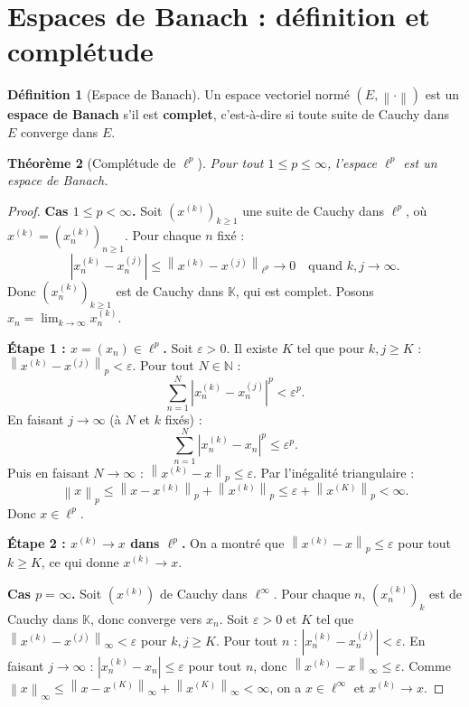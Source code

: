 \documentclass[a4paper,12pt]{book}
\newcommand{\N}{\mathbb{N}}
\newcommand{\K}{\mathbb{K}}
\newcommand{\norm}[1]{\left\| #1 \right\|}
\newcommand{\abs}[1]{\left| #1 \right|}
\theoremstyle{definition}
\newtheorem{definition}{Définition}[chapter]
\theoremstyle{plain}
\newtheorem{theoreme}[definition]{Théorème}
\theoremstyle{remark}
\begin{document}
\section{Espaces de Banach : définition et complétude}

\begin{definition}[Espace de Banach]\label{def:banach}
Un espace vectoriel normé $(E, \norm{\cdot})$ est un \textbf{espace de Banach} s'il est \textbf{complet}, c'est-à-dire si toute suite de Cauchy dans $E$ converge dans $E$.
\end{definition}

\begin{theoreme}[Complétude de $\ell^p$]\label{thm:ell-p-complet}
Pour tout $1 \leq p \leq \infty$, l'espace $\ell^p$ est un espace de Banach.
\end{theoreme}

\begin{proof}
\textbf{Cas $1 \leq p < \infty$.} Soit $(x^{(k)})_{k \geq 1}$ une suite de Cauchy dans $\ell^p$, où $x^{(k)} = (x_n^{(k)})_{n \geq 1}$. Pour chaque $n$ fixé :
\[
    \abs{x_n^{(k)} - x_n^{(j)}} \leq \norm{x^{(k)} - x^{(j)}}_{\ell^p} \to 0 \quad \text{quand } k, j \to \infty.
\]
Donc $(x_n^{(k)})_{k \geq 1}$ est de Cauchy dans $\K$, qui est complet. Posons $x_n = \lim_{k \to \infty} x_n^{(k)}$.

\textbf{Étape 1 : $x = (x_n) \in \ell^p$.} Soit $\varepsilon > 0$. Il existe $K$ tel que pour $k, j \geq K$ : $\norm{x^{(k)} - x^{(j)}}_p < \varepsilon$. Pour tout $N \in \N$ :
\[
    \sum_{n=1}^{N} \abs{x_n^{(k)} - x_n^{(j)}}^p < \varepsilon^p.
\]
En faisant $j \to \infty$ (à $N$ et $k$ fixés) :
\[
    \sum_{n=1}^{N} \abs{x_n^{(k)} - x_n}^p \leq \varepsilon^p.
\]
Puis en faisant $N \to \infty$ : $\norm{x^{(k)} - x}_p \leq \varepsilon$. Par l'inégalité triangulaire :
\[
    \norm{x}_p \leq \norm{x - x^{(k)}}_p + \norm{x^{(k)}}_p \leq \varepsilon + \norm{x^{(K)}}_p < \infty.
\]
Donc $x \in \ell^p$.

\textbf{Étape 2 : $x^{(k)} \to x$ dans $\ell^p$.} On a montré que $\norm{x^{(k)} - x}_p \leq \varepsilon$ pour tout $k \geq K$, ce qui donne $x^{(k)} \to x$.

\textbf{Cas $p = \infty$.} Soit $(x^{(k)})$ de Cauchy dans $\ell^\infty$. Pour chaque $n$, $(x_n^{(k)})_k$ est de Cauchy dans $\K$, donc converge vers $x_n$. Soit $\varepsilon > 0$ et $K$ tel que $\norm{x^{(k)} - x^{(j)}}_\infty < \varepsilon$ pour $k, j \geq K$. Pour tout $n$ : $\abs{x_n^{(k)} - x_n^{(j)}} < \varepsilon$. En faisant $j \to \infty$ : $\abs{x_n^{(k)} - x_n} \leq \varepsilon$ pour tout $n$, donc $\norm{x^{(k)} - x}_\infty \leq \varepsilon$. Comme $\norm{x}_\infty \leq \norm{x - x^{(K)}}_\infty + \norm{x^{(K)}}_\infty < \infty$, on a $x \in \ell^\infty$ et $x^{(k)} \to x$.
\end{proof}
\end{document}
